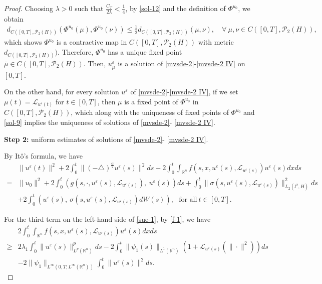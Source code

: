 \documentclass[11pt]{article}
\numberwithin{equation}{section}
\theoremstyle{plain}
\def\geq{\geqslant}
\def\leq{\leqslant}
\def\no{\nonumber}
\begin{document}
\begin{proof}
 Choosing $\lambda > 0$ such that $\frac{C_T}{2\lambda} < \frac{1}{4}$,
  by \eqref{sol-12} and the definition of $\Phi^{u_0}$,
 we obtain
\begin{align*}
         {d_{C( [0,T], \mathcal{P}_2(H) )}}
           \left( \Phi^{u_0} (\mu),
                  \Phi^{u_0} (\nu)
           \right)
   \leq \frac{1}{2}
    {d_{C( [0,T], \mathcal{P}_2(H) )}}
   \left( \mu, \nu \right),
   \quad \forall \ \mu, \nu \in
    {C( [0,T], \mathcal{P}_2(H) )},
\end{align*}
 which shows $\Phi^{u_0}$ is a  contractive map in
 ${C( [0,T], \mathcal{P}_2(H) )}
 $ with metric
$
 d_{C( [0,T], \mathcal{P}_2(H) )}
 )$.
 Therefore,
  $\Phi^{u_0}$ has a unique fixed point $\bar{\mu} \in
  {C( [0,T], \mathcal{P}_2(H) )}
 $.
 Then,
    $u_{\bar{\mu}}^\varepsilon
    $
 is a solution of
 \eqref{mvsde-2}-\eqref{mvsde-2 IV}   on $[0,T]$.

 On the other hand, for every solution $u^\varepsilon$ of
 \eqref{mvsde-2}-\eqref{mvsde-2 IV},
 if we set
   $\mu(t) = \mathcal{L}_{u^\varepsilon(t)}$
   for $t\in [0,T]$,
   then  $\mu$
   is a  fixed point of $\Phi^{u_0}$ in
   $
{C( [0,T], \mathcal{P}_2(H) )}
$, which along with the uniqueness
of fixed points of
$\Phi^{u_0}$ and
\eqref{sol-9}
implies the uniqueness of solutions
of
 \eqref{mvsde-2}- \eqref{mvsde-2 IV}.


 {\bf Step 2:}  uniform estimates of solutions  of    \eqref{mvsde-2}- \eqref{mvsde-2 IV}.



 By It\^{o}'s formula,
 we have
\begin{align}\label{sue-1}
 & \| u^\varepsilon(t) \|^2
  + 2 \int_0^t \|(-\triangle)^{\frac{\alpha}{2}} u^\varepsilon(s) \|^2 ds
  + 2 \int_0^t \int_{ \mathbb{R}^n}
   f(s, x, u^\varepsilon(s), \mathcal{L}_{u^\varepsilon(s)} )  u^\varepsilon(s)  dx  ds \no\\
  = & \| u_0 \|^2
      + 2 \int_0^t \left( g(s, \cdot, u^\varepsilon(s), \mathcal{L}_{u^\varepsilon(s)} ),\ u^\varepsilon(s) \right) ds
      + \int_0^t \| \sigma (s, u^\varepsilon(s), \mathcal{L}_{u^\varepsilon(s)} ) \|_{L_2(l^2,H)}^2 ds \no\\
    & + 2 \int_0^t \left( u^\varepsilon(s),\  \sigma(s, u^\varepsilon(s), \mathcal{L}_{u^\varepsilon(s)} ) dW(s) \right),
     \ \ \  \text{for all} \  t \in [0,T].
\end{align}

 For the third
  term on the left-hand side of \eqref{sue-1},
 by \eqref{f-1}, we have
\begin{align} \label{sue-2}
      & 2 \int_0^t \int_{ \mathbb{R}^n}
        f(s, x, u^\varepsilon(s), \mathcal{L}_{u^\varepsilon(s)} )  u^\varepsilon(s) dx ds
           \nonumber \\
 \geq & 2 \lambda_1 \int_0^t \| u^\varepsilon (s) \|_{L^p(\mathbb{R}^n)}^p ds
        - 2 \int_0^t \| \psi_1(s) \|_{L^1(\mathbb{R}^n)} \left( 1 + \mathcal{L}_{u^\varepsilon(s)}
        (\|\cdot\|^2) \right) ds
         \nonumber \\
          & -2
        \| \psi_1 \|_{
            L^\infty (0,T;
         L^\infty (\mathbb{R}^n) )}
     \int_0^t
      \| u^\varepsilon (s) \|^2 ds.
 \end{align}


\end{proof}
\end{document}
